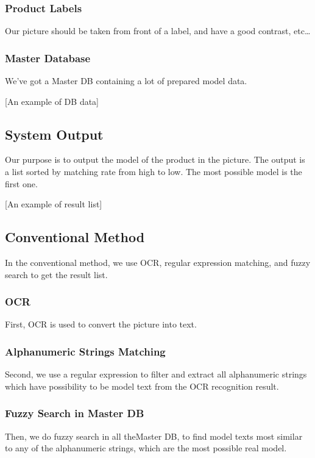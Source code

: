 \documentclass[technicalreport]{ieicej}
\begin{document}
        \subsubsection{Product Labels}
        Our picture should be taken from front of a label, and have a good contrast, etc\dots

        \subsubsection{Master Database}
        We've got a Master DB containing a lot of prepared model data.

        [An example of DB data]
    
    \subsection{System Output}
        Our purpose is to output the model of the product in the picture. The output is a list sorted by matching rate from high to low. The most possible model is the first one.

        [An example of result list]

    \subsection{Conventional Method}
        In the conventional method, we use OCR, regular expression matching, and fuzzy search to get the result list.

        \subsubsection{OCR}
        First, OCR is used to convert the picture into text.
        
        \subsubsection{Alphanumeric Strings Matching}
        Second, we use a regular expression to filter and extract all alphanumeric strings which have possibility to be model text from the OCR recognition result.

        \subsubsection{Fuzzy Search in Master DB}
        Then, we do fuzzy search in all theMaster DB, to find model texts most similar to any of the alphanumeric strings, which are the most possible real model. 
\end{document}
